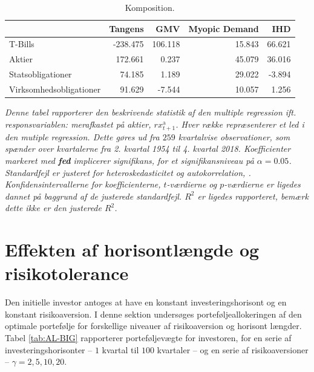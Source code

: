 \documentclass[
  a4paper,
  oneside]{memoir}
\begin{document}
\begin{table}[H]

\caption{\label{tab:AL-KOMP}Komposition.}
\centering
\begin{threeparttable}
\begin{tabular}[t]{lrrrr}
\toprule
  & Tangens & GMV & Myopic Demand & IHD\\
\midrule
\rowcolor{gray!6}  T-Bills & -238.475 & 106.118 & 15.843 & 66.621\\
Aktier & 172.661 & 0.237 & 45.079 & 36.016\\
\rowcolor{gray!6}  Statsobligationer & 74.185 & 1.189 & 29.022 & -3.894\\
Virksomhedsobligationer & 91.629 & -7.544 & 10.057 & 1.256\\
\bottomrule
\end{tabular}
\begin{tablenotes}
\item \textit{Denne tabel rapporterer den beskrivende statistik af den multiple regression ift. responsvariablen: merafkastet på aktier, $rx_{t+1}^{\text{a}}$. Hver række repræsenterer et led i den mutiple regression. Dette gøres ud fra $259$ kvartalvise observationer, som spænder over kvartalerne fra 2. kvartal 1954 til 4. kvartal 2018. Koefficienter markeret med \textbf{fed} implicerer signifikans, for et signifikansniveau på $\alpha=0.05$. Standardfejl er justeret for heteroskedasticitet og autokorrelation, \citep{Newey1987}. Konfidensintervallerne for koefficienterne, $t$-værdierne og $p$-værdierne er ligedes dannet på baggrund af de justerede standardfejl. $R^2$ er ligedes rapporteret, bemærk dette ikke er den justerede $R^2$.}
\end{tablenotes}
\end{threeparttable}
\end{table}

\hypertarget{effekten-af-horisontluxe6ngde-og-risikotolerance}{%
\section{Effekten af horisontlængde og risikotolerance}\label{effekten-af-horisontluxe6ngde-og-risikotolerance}}

Den initielle investor antoges at have en konstant investeringshorisont og en konstant risikoaversion. I denne sektion undersøges porteføljeallokeringen af den optimale portefølje for forskellige niveauer af risikoaversion og horisont længder. Tabel \ref{tab:AL-BIG} rapporterer porteføljevægte for investoren, for en serie af investeringshorisonter -- \(1\) kvartal til \(100\) kvartaler -- og en serie af risikoaversioner -- \(\gamma=2,5,10,20\).
\end{document}
